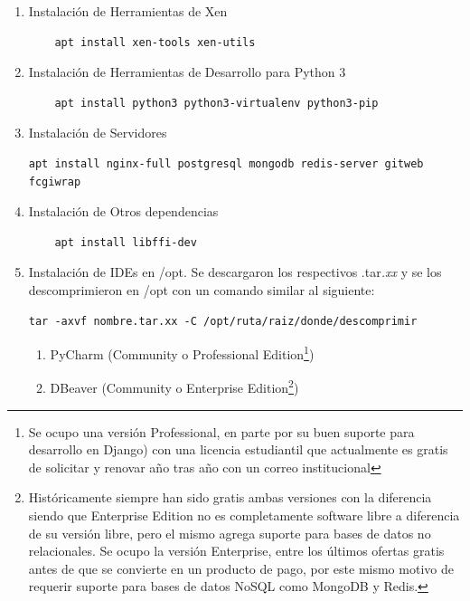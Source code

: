 \begin{enumerate}
\begin{lstlisting}[breaklines=true]
	auto xenbr0
	iface xenbr0 inet static
		address 10.10.10.1
		netmask 255.255.255.0
		bridge_ports wlan0

	#other possibly useful options in a
	#	virtualized environment
		#bridge_stp off		# disable
		#		Spanning Tree Protocol
		#bridge_waitport 0	# no delay
		#		before a port becomes
		#		available
		#bridge_fd 0		# no forwarding
		#		delay

	## configure a (separate) bridge for
	#	the DomUs without giving Dom0 an
	#	IP on it
	#auto xenbr1
	#iface xenbr1 inet manual
	#   bridge_ports eth1

	EOF

	reboot
		\end{lstlisting}
	\item Instalación de Herramientas de Xen
		\begin{lstlisting}
	apt install xen-tools xen-utils
		\end{lstlisting}
    \item Instalación de Herramientas de Desarrollo para Python 3
    	\begin{lstlisting}
	apt install python3 python3-virtualenv python3-pip
    	\end{lstlisting}
    \item Instalación de Servidores
    	\begin{lstlisting}[breaklines=true]
	apt install nginx-full postgresql mongodb redis-server gitweb fcgiwrap
    	\end{lstlisting}
    \item Instalación de Otros dependencias
    	\begin{lstlisting}
	apt install libffi-dev
    	\end{lstlisting}
    \item Instalación de IDEs en /opt. Se descargaron los respectivos .tar\textit{.xx} y se los descomprimieron en /opt con un comando similar al siguiente:
    	\begin{lstlisting}[breaklines=true]
	tar -axvf nombre.tar.xx -C /opt/ruta/raiz/donde/descomprimir
    	\end{lstlisting}
    \begin{enumerate}
    	\item PyCharm (Community o Professional Edition\footnote{Se ocupo una versión Professional, en parte por su buen suporte para desarrollo en Django) con una licencia estudiantil que actualmente es gratis de solicitar y renovar año tras año con un correo institucional})
        \item DBeaver (Community o Enterprise Edition\footnote{Históricamente siempre han sido gratis ambas versiones con la diferencia siendo que Enterprise Edition no es completamente software libre a diferencia de su versión libre, pero el mismo agrega suporte para bases de datos no relacionales. Se ocupo la versión Enterprise, entre los últimos ofertas gratis antes de que se convierte en un producto de pago, por este mismo motivo de requerir suporte para bases de datos NoSQL como MongoDB y Redis.})
    \end{enumerate}
\end{enumerate}

